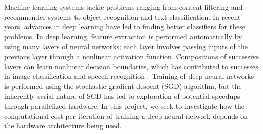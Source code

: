 Machine learning systems tackle problems ranging from content filtering and recommender systems to object recognition and text classification.  In recent years, advances in deep learning have led to finding better classifiers for these problems.  In deep learning, feature extraction is performed automatically by using many layers of neural networks; each layer involves passing inputs of the previous layer through a nonlinear activation function.  Compositions of successive layers can learn nonlinear decision boundaries, which has contributed to successes in image classification  and speech recognition \cite{deeplearning}.  Training of deep neural networks is performed using the stochastic gradient descent (SGD) algorithm, but the inherently serial nature of SGD has led to exploration of potential speedups through parallelized hardware.  In this project, we seek to investigate how the computational cost per iteration of training a deep neural network depends on the hardware architecture being used.